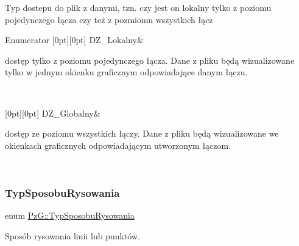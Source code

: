 Typ dostepu do plik z danymi, tzn. czy jest on lokalny tylko z poziomu pojedynczego łącza czy też z pozmiomu wszystkich łącz \begin{DoxyEnumFields}{Enumerator}
[0pt][0pt]{}\mbox{\label{namespace_pz_g_af74528dea7061dcb07cf44f315703cf4ab239a07233614b519b0f2f5ca8af7826}} 
D\+Z\+\_\+\+Lokalny&
\begin{DoxyItemize}
\item dostęp tylko z poziomu pojedynczego łącza. Dane z pliku będą wizualizowane tylko w jednym okienku graficznym odpowiadające danym łączu. 
\end{DoxyItemize}\\
\hline

[0pt][0pt]{}\mbox{\label{namespace_pz_g_af74528dea7061dcb07cf44f315703cf4a21d511d2fe6c4e27e30ebe255405e6d9}} 
D\+Z\+\_\+\+Globalny&
\begin{DoxyItemize}
\item dostęp ze poziomu wszystkich łączy. Dane z pliku będą wizualizowane we okienkach graficznych odpowiadającym utworzonym łączom. 
\end{DoxyItemize}\\
\hline

\end{DoxyEnumFields}
\mbox{\label{namespace_pz_g_a53d89f50686ddd39301f9706cc1247dc}} 
\subsubsection{\texorpdfstring{TypSposobuRysowania}{TypSposobuRysowania}}
{\footnotesize\ttfamily enum \mbox{\hyperlink{namespace_pz_g_a53d89f50686ddd39301f9706cc1247dc}{Pz\+G\+::\+Typ\+Sposobu\+Rysowania}}}



Sposób rysowania linii lub punktów. 

